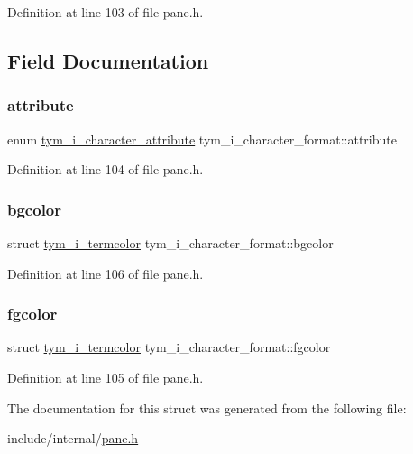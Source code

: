 Definition at line 103 of file pane.\+h.



\subsection{Field Documentation}
\mbox{\label{structtym__i__character__format_a276bf9587b4bdad1f8a3c0cefe42e9ae}} 
\subsubsection{\texorpdfstring{attribute}{attribute}}
{\footnotesize\ttfamily enum \hyperlink{pane_8h_ac6609b89967e8b2b9e46a1630a260654}{tym\+\_\+i\+\_\+character\+\_\+attribute} tym\+\_\+i\+\_\+character\+\_\+format\+::attribute}



Definition at line 104 of file pane.\+h.

\mbox{\label{structtym__i__character__format_afa091652fea5f7d0729d18fb4a8f984f}} 
\subsubsection{\texorpdfstring{bgcolor}{bgcolor}}
{\footnotesize\ttfamily struct \hyperlink{structtym__i__termcolor}{tym\+\_\+i\+\_\+termcolor} tym\+\_\+i\+\_\+character\+\_\+format\+::bgcolor}



Definition at line 106 of file pane.\+h.

\mbox{\label{structtym__i__character__format_acf1b3f3b19b6807936d8cc633b8fdb0e}} 
\subsubsection{\texorpdfstring{fgcolor}{fgcolor}}
{\footnotesize\ttfamily struct \hyperlink{structtym__i__termcolor}{tym\+\_\+i\+\_\+termcolor} tym\+\_\+i\+\_\+character\+\_\+format\+::fgcolor}



Definition at line 105 of file pane.\+h.



The documentation for this struct was generated from the following file\+:\begin{DoxyCompactItemize}
\item 
include/internal/\hyperlink{pane_8h}{pane.\+h}\end{DoxyCompactItemize}
